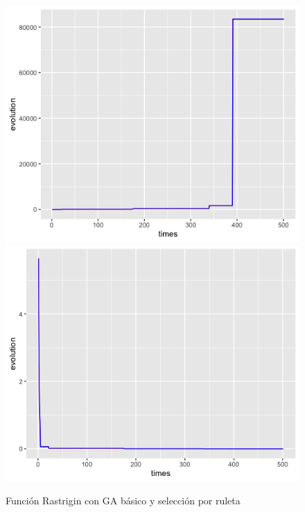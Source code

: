 \documentclass[letterpaper,12pt]{article}
\theoremstyle{definition}
\begin{document}
\begin{figure}[H]
    \includegraphics[width=\linewidth]{rast_basic_fitness}
  \endminipage\hfill
    \includegraphics[width=\linewidth]{rast_basic_eval}
  \endminipage\hfill
  \caption{Función Rastrigin con GA básico y selección por ruleta}
  \label{fig:rast_basic}
\end{figure}
\end{document}
